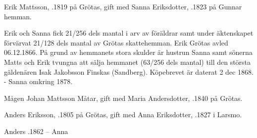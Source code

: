 Erik Mattsson, .1819 på Grötas, gift med Sanna Eriksdotter, .1823 på Gunnar hemman.
\begin{jhchildren}
  \item {}
  \item {}
  \item {}
  \item {}
  \item {}
  \item {}
  \item {}
  \item {}
  \item {}
  \item {}
  \item {}
\end{jhchildren}
Erik och Sanna fick 21/256 dels mantal i arv av föräldrar samt under äktenskapet förvärvat 21/128 dels mantal av Grötas skattehemman.	Erik Grötas avled 06.12.1866. På grund av  hemmanets stora skulder är hustrun Sanna samt sönerna Matts och Erik tvungna att sälja hemmanet (63/256 dels mantal) till den största gäldenären Isak Jakobsson Finskas (Sandberg). Köpebrevet är daterat 2 dec 1868. - Sanna \textdied omkring 1878.


Mågen Johan Mattsson Måtar, gift med Maria Andersdotter, .1840 på Grötas.


Anders Eriksson, .1805 på Grötas, gift med Anna Eriksdotter, .1827 i Larsmo.
\begin{jhchildren}
  \item {}
  \item {}
  \item {}
  \item {}
  \item {}
  \item {}
  \item {}
  \item {}
  \item {}
  \item {}
\end{jhchildren}
Anders .1862  --  Anna 


